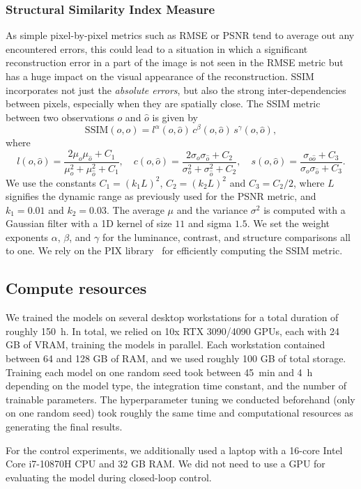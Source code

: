 \subsubsection{Structural Similarity Index Measure}
As simple pixel-by-pixel metrics such as \gls{RMSE} or \gls{PSNR} tend to average out any encountered errors, this could lead to a situation in which a significant reconstruction error in a part of the image is not seen in the \gls{RMSE} metric but has a huge impact on the visual appearance of the reconstruction. \gls{SSIM}~\cite{wang2004image} incorporates not just the \emph{absolute errors}, but also the strong inter-dependencies between pixels, especially when they are spatially close.
The \gls{SSIM} metric between two observations $o$ and $\hat{o}$ is given by
\begin{equation}
    \mathrm{SSIM}(o, \hat{o}) = l^\alpha(o, \hat{o}) \, c^\beta(o, \hat{o}) \, s^\gamma(o, \hat{o}),
\end{equation}
where
\begin{equation}
    l(o, \hat{o}) = \frac{2 \mu_o \mu_{\hat{o}} + C_1}{\mu_o^2 + \mu_{\hat{o}}^2 + C_1},
    \quad
    c(o, \hat{o}) = \frac{2 \sigma_o \sigma_{\hat{o}} + C_2}{\sigma_o^2 + \sigma_{\hat{o}}^2 + C_2},
    \quad 
    s(o, \hat{o}) = \frac{\sigma_{o\hat{o}} + C_3}{\sigma_o \sigma_{\hat{o}} + C_3}.
\end{equation}
We use the constants $C_1 = (k_1 L)^2$, $C_2 = (k_2 L)^2$ and $C_3 = C_2 / 2$, where $L$ signifies the dynamic range as previously used for the \gls{PSNR} metric,
and $k_1 = 0.01$ and $k_2 = 0.03$. The average $\mu$ and the variance $\sigma^2$ is computed with a Gaussian filter with a 1D kernel of size $11$ and sigma $1.5$.
We set the weight exponents $\alpha$, $\beta$, and $\gamma$ for the luminance, contrast, and structure comparisons all to one.
We rely on the PIX library~\cite{deepmind2020jax} for efficiently computing the \gls{SSIM} metric.

\subsection{Compute resources}\label{apx:sub:compute_resource}

We trained the models on several desktop workstations for a total duration of roughly \SI{150}{h}.
In total, we relied on 10x RTX 3090/4090 GPUs, each with 24 GB of VRAM, training the models in parallel.
Each workstation contained between 64 and 128 GB of RAM, and we used roughly 100 GB of total storage. 
Training each model on one random seed took between \SI{45}{min} and \SI{4}{h} depending on the model type, the integration time constant, and the number of trainable parameters.
The hyperparameter tuning we conducted beforehand (only on one random seed) took roughly the same time and computational resources as generating the final results.

For the control experiments, we additionally used a laptop with a 16-core Intel Core i7-10870H CPU and 32 GB RAM. We did not need to use a GPU for evaluating the model during closed-loop control.